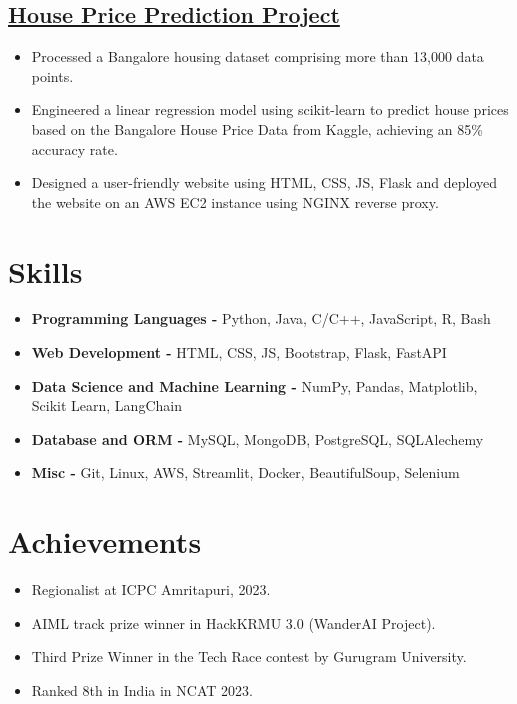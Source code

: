 \documentclass[a4paper,11pt]{article}
\begin{document}
\subsection*{\href{https://github.com/kanakOS01/house-prediction-model}{House Price Prediction Project}}
\begin{itemize}[itemsep=0pt,parsep=0pt,topsep=0pt,partopsep=0pt]
    \item Processed a Bangalore housing dataset comprising more than 13,000 data points.
    \item Engineered a linear regression model using scikit-learn to predict house prices based on the Bangalore House Price Data from Kaggle, achieving an 85\% accuracy rate.
    \item Designed a user-friendly website using HTML, CSS, JS, Flask and deployed the website on an AWS EC2 instance using NGINX reverse proxy.
\end{itemize}
\vspace{-5mm}

\section*{Skills}
\vspace{-2mm}
\begin{itemize}
    \item \textbf{Programming Languages -} \small Python, Java, C/C++, JavaScript, R, Bash
    \vspace{-2mm}
    \item \textbf{Web Development -} \small HTML, CSS, JS, Bootstrap, Flask, FastAPI
    \vspace{-2mm}
    \item \textbf{Data Science and Machine Learning -} \small NumPy, Pandas, Matplotlib, Scikit Learn, LangChain
    \vspace{-2mm}
    \item \textbf{Database and ORM -} \small MySQL, MongoDB, PostgreSQL, SQLAlechemy
    \vspace{-2mm}
    \item \textbf{Misc -} \small Git, Linux, AWS, Streamlit, Docker, BeautifulSoup, Selenium
    \vspace{-2mm}
\end{itemize}
\vspace{-5mm}

\section*{Achievements}
\vspace{-2mm}
\begin{itemize}[label=\textbullet, left=0pt, itemsep=0pt,parsep=0pt,topsep=0pt,partopsep=0pt]
    \item Regionalist at ICPC Amritapuri, 2023.
    \item AIML track prize winner in HackKRMU 3.0 (WanderAI Project).
    \item Third Prize Winner in the Tech Race contest by Gurugram University.
    \item Ranked 8th in India in NCAT 2023.
\end{itemize}
\vspace{-5mm}
\end{document}
